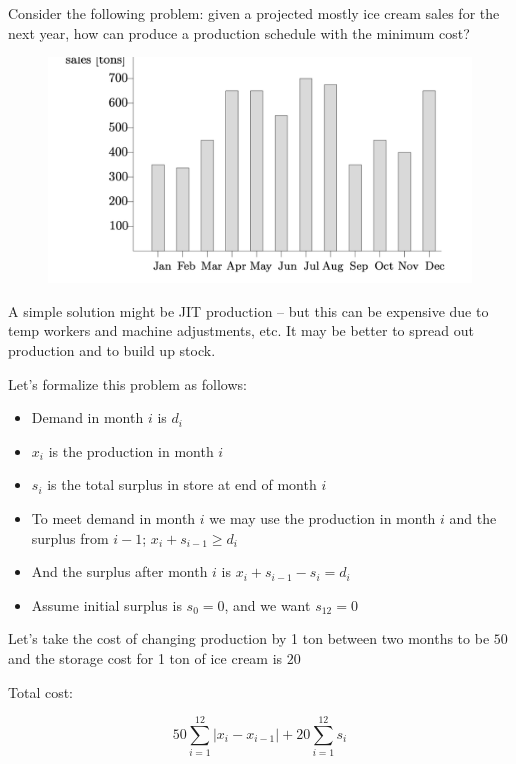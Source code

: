 \documentclass[../notes.tex]{subfiles}
\begin{document}
Consider the following problem: given a projected mostly ice cream sales for the next year, how can produce a production schedule with the minimum cost?

\begin{example}
    \begin{figure}[H]
        \centering
        \includegraphics[width=0.8\linewidth]{img/image_2023-03-08-16-47-17.png}
    \end{figure}
\end{example}

A simple solution might be JIT production -- but this can be expensive due to temp workers and machine adjustments, etc. 
It may be better to spread out production and to build up stock.


Let's formalize this problem as follows:

\begin{itemize}
    \item Demand in month $ i $ is $ d_i $
    \item $ x_i $ is the production in month $ i $
    \item $ s_i $ is the total surplus in store at end of month $ i $
    \item To meet demand in month $ i $ we may use the production in month $ i $ and the surplus from $ i-1 $; $ x_i + s_{i-1} \ge  d_i $
    \item And the surplus after month $ i $ is $ x_i + s_{i-1} - s_i = d_i $
    \item Assume initial surplus is $ s_0 = 0 $, and we want $ s_{12} = 0 $
\end{itemize}

Let's take the cost of changing production by 1 ton between two months to be $ 50 $ and the storage cost for 1 ton of ice cream is $ 20 $

Total cost:

\begin{equation}
    50 \sum_{i = 1}^{12} |x_i - x_{i-1}| + 20 \sum_{i = 1}^{12} s_i
\end{equation}
\end{document}

